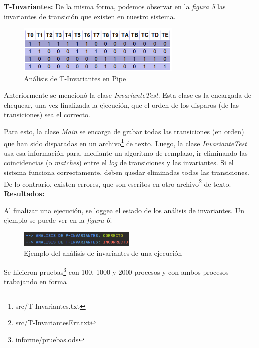 \documentclass{article}
\newcommand{\fninv}{src/T-Invariantes.txt}
\newcommand{\fninverr}{src/T-InvariantesErr.txt}
\newcommand{\fnpruebas}{informe/pruebas.ods}
\begin{document}
    \textbf{T-Invariantes:} \newline \newline
    De la misma forma, podemos observar en la \emph{figura 5} las invariantes de transición
    que existen en nuestro sistema. \\
    \begin{figure}[H]
        \includegraphics[width=0.7\textwidth, center]{t-invariante.png}
        \caption{Análisis de T-Invariantes en Pipe}
    \end{figure}   
    Anteriormente se mencionó la clase \emph{InvarianteTest}. Esta clase es la encargada
    de chequear, una vez finalizada la ejecución, que el orden de los disparos (de las 
    transiciones) sea el correcto. \par
    Para esto, la clase \emph{Main} se encarga de grabar todas las transiciones (en orden) 
    que han sido disparadas en un archivo\footnote{\fninv} de texto. Luego, la
    clase \emph{InvarianteTest} usa esa información para, mediante un algoritmo de remplazo,
    ir eliminando las coincidencias (o \emph{matches}) entre el \emph{log} de transiciones y
    las invariantes. Si el sistema funciona correctamente, deben quedar eliminadas todas las
    transiciones. De lo contrario, existen errores, que son escritos en otro 
    archivo\footnote{\fninverr} de texto. \newline \newline
    \textbf{Resultados:} \newline \newline \par
    Al finalizar una ejecución, se loggea el estado de los análisis de invariantes. Un ejemplo
    se puede ver en la \emph{figura 6}. \par
    \begin{figure}[H]
        \includegraphics[width=0.5\textwidth, center]{analisis-invariantes-ej.png}
        \caption{Ejemplo del análisis de invariantes de una ejecución}
    \end{figure}
    Se hicieron pruebas\footnote{\fnpruebas} con 100, 1000 y 2000 procesos y con ambos procesos trabajando en forma
\end{document}
